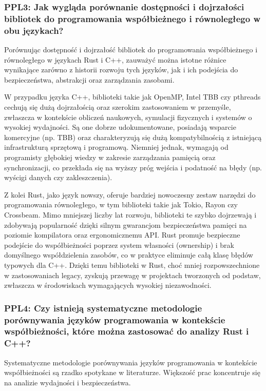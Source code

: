 \subsubsection{PPL3: Jak wygląda porównanie dostępności i dojrzałości bibliotek do programowania współbieżnego i równoległego w obu językach?}
Porównując dostępność i dojrzałość bibliotek do programowania współbieżnego i równoległego w językach Rust i C++, zauważyć można istotne różnice wynikające zarówno z historii rozwoju tych języków, jak i ich podejścia do bezpieczeństwa, abstrakcji oraz zarządzania zasobami.

W przypadku języka C++, biblioteki takie jak OpenMP, Intel TBB czy pthreads cechują się dużą dojrzałością oraz szerokim zastosowaniem w przemyśle, zwłaszcza w kontekście obliczeń naukowych, symulacji fizycznych i systemów o wysokiej wydajności. Są one dobrze udokumentowane, posiadają wsparcie komercyjne (np. TBB) oraz charakteryzują się dużą kompatybilnością z istniejącą infrastrukturą sprzętową i programową. Niemniej jednak, wymagają od programisty głębokiej wiedzy w zakresie zarządzania pamięcią oraz synchronizacji, co przekłada się na wyższy próg wejścia i podatność na błędy (np. wyścigi danych czy zakleszczenia).

Z kolei Rust, jako język nowszy, oferuje bardziej nowoczesny zestaw narzędzi do programowania równoległego, w tym biblioteki takie jak Tokio, Rayon czy Crossbeam. Mimo mniejszej liczby lat rozwoju, biblioteki te szybko dojrzewają i zdobywają popularność dzięki silnym gwarancjom bezpieczeństwa pamięci na poziomie kompilatora oraz ergonomicznemu API. Rust promuje bezpieczne podejście do współbieżności poprzez system własności (ownership) i brak domyślnego współdzielenia zasobów, co w praktyce eliminuje całą klasę błędów typowych dla C++. Dzięki temu biblioteki w Rust, choć mniej rozpowszechnione w zastosowaniach legacy, zyskują przewagę w projektach tworzonych od podstaw, zwłaszcza w środowiskach wymagających wysokiej niezawodności.

\subsubsection{PPL4: Czy istnieją systematyczne metodologie porównywania języków programowania w kontekście współbieżności, które można zastosować do analizy Rust i C++?}
Systematyczne metodologie porównywania języków programowania w kontekście współbieżności są rzadko spotykane w literaturze. Większość prac koncentruje się na analizie wydajności i bezpieczeństwa.

